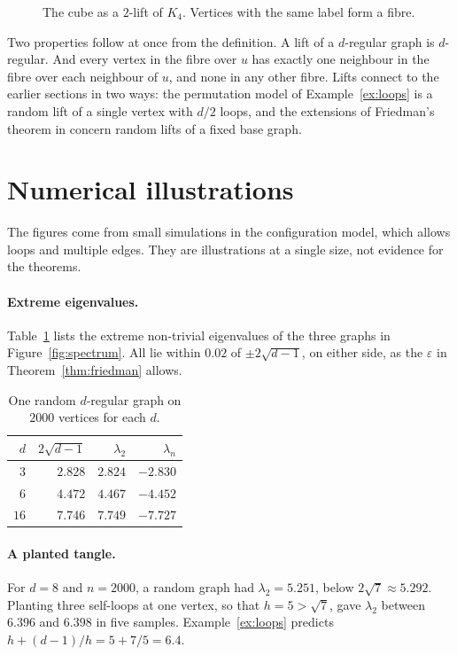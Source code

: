 \documentclass[11pt,letterpaper]{article}
\theoremstyle{definition}
\theoremstyle{remark}
\newcommand{\edge}{2\sqrt{d-1}}
\newcommand{\eps}{\varepsilon}
\begin{document}
\begin{figure}[ht]
  \centering
  
  \caption{The cube as a $2$-lift of $K_4$. Vertices with the same label form a fibre.}
  \label{fig:lift}
\end{figure}

Two properties follow at once from the definition. A lift of a $d$-regular graph is $d$-regular.
And every vertex in the fibre over $u$ has exactly one neighbour in the fibre over each neighbour
of $u$, and none in any other fibre. Lifts connect to the earlier sections in two ways: the
permutation model of Example~\ref{ex:loops} is a random lift of a single vertex with $d/2$ loops,
and the extensions of Friedman's theorem in \cite{FK,B} concern random lifts of a fixed base
graph.

\section{Numerical illustrations}

The figures come from small simulations in the configuration model, which allows loops and
multiple edges. They are illustrations at a single size, not evidence for the theorems.

\paragraph{Extreme eigenvalues.}
Table~\ref{tab:extreme} lists the extreme non-trivial eigenvalues of the three graphs in
Figure~\ref{fig:spectrum}. All lie within $0.02$ of $\pm\edge$, on either side, as the $\eps$ in
Theorem~\ref{thm:friedman} allows.

\begin{table}[ht]
\centering\small
\begin{tabular}{@{}rrrr@{}}
  \toprule
  $d$ & $\edge$ & $\lambda_2$ & $\lambda_n$\\
  \midrule
  $3$ & $2.828$ & $2.824$ & $-2.830$\\
  $6$ & $4.472$ & $4.467$ & $-4.452$\\
  $16$ & $7.746$ & $7.749$ & $-7.727$\\
  \bottomrule
\end{tabular}
\caption{One random $d$-regular graph on $2000$ vertices for each $d$.}
\label{tab:extreme}
\end{table}

\paragraph{A planted tangle.}
For $d=8$ and $n=2000$, a random graph had $\lambda_2=5.251$, below $2\sqrt7\approx5.292$.
Planting three self-loops at one vertex, so that $h=5>\sqrt7$, gave $\lambda_2$ between $6.396$
and $6.398$ in five samples. Example~\ref{ex:loops} predicts $h+(d-1)/h=5+7/5=6.4$.
\end{document}

